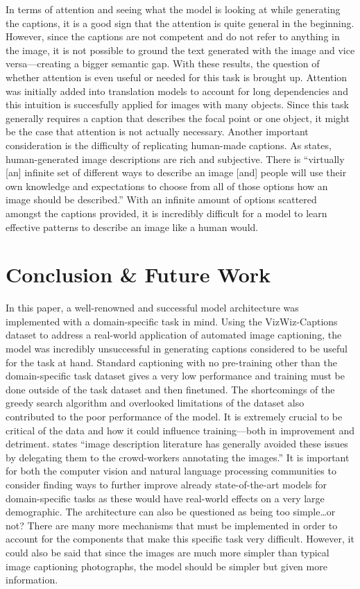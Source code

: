 \documentclass[11pt,a4paper]{article}
\begin{document}
In terms of attention and seeing what the model is looking at while generating the captions, it is a good sign that the attention is quite general in the beginning. However, since the captions are not competent and do not refer to anything in the image, it is not possible to ground the text generated with the image and vice versa—creating a bigger semantic gap. With these results, the question of whether attention is even useful or needed for this task is brought up. Attention was initially added into translation models to account for long dependencies and this intuition is succesfully applied for images with many objects. Since this task generally requires a caption that describes the focal point or one object, it might be the case that attention is not actually necessary. Another important consideration is the difficulty of replicating human-made captions. As \citet{miltenburg-pragmatic} states, human-generated image descriptions are rich and subjective. There is “virtually [an] infinite set of different ways to describe an image [and] people will use their own knowledge and expectations to choose from all of those options how an image should be described.” \citep{miltenburg-pragmatic} With an infinite amount of options scattered amongst the captions provided, it is incredibly difficult for a model to learn effective patterns to describe an image like a human would.

\section{Conclusion \& Future Work}
\label{sec:conc&fw}
In this paper, a well-renowned and successful model architecture was implemented with a domain-specific task in mind. Using the VizWiz-Captions dataset to address a real-world application of automated image captioning, the model was incredibly unsuccessful in generating captions considered to be useful for the task at hand. Standard captioning with no pre-training other than the domain-specific task dataset gives a very low performance and training must be done outside of the task dataset and then finetuned. The shortcomings of the greedy search algorithm and overlooked limitations of the dataset also contributed to the poor performance of the model. It is extremely crucial to be critical of the data and how it could influence training—both in improvement and detriment. \citet{miltenburg-pragmatic} states “image description literature has generally avoided these issues by delegating them to the crowd-workers annotating the images.” It is important for both the computer vision and natural language processing communities to consider finding ways to further improve already state-of-the-art models for domain-specific tasks as these would have real-world effects on a very large demographic. The architecture can also be questioned as being too simple…or not? There are many more mechanisms that must be implemented in order to account for the components that make this specific task very difficult. However, it could also be said that since the images are much more simpler than typical image captioning photographs, the model should be simpler but given more information. 
\end{document}
